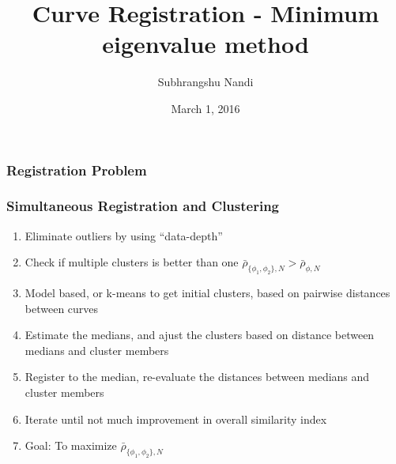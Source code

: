 \documentclass[10pt,dvipsnames,table]{beamer}
\title[Registration]{Curve Registration - Minimum eigenvalue method}
\author{Subhrangshu Nandi}
\institute[Prelim exam]{Preliminary Exam \\
Department of Statistics \\
University of Wisconsin-Madison}
\date{March 1, 2016}
\begin{document}
\setlength{\baselineskip}{16truept}


\begin{frame}
\frametitle{Registration Problem}


\end{frame}

\begin{frame}
\frametitle{Simultaneous Registration and Clustering}
\begin{enumerate}
\item Eliminate outliers by using ``data-depth''
\item Check if multiple clusters is better than one $\bar{\rho}_{\{\phi_1, \phi_2\}, N} > \bar{\rho}_{\phi, N}$
\item Model based, or k-means to get initial clusters, based on pairwise distances between curves
\item Estimate the medians, and ajust the clusters based on distance between medians and cluster members
\item Register to the median, re-evaluate the distances between medians and cluster members
\item Iterate until not much improvement in overall similarity index
\item Goal: To maximize $\bar{\rho}_{\{\phi_1, \phi_2\}, N}$
\end{enumerate}
\end{frame}
\end{document}
